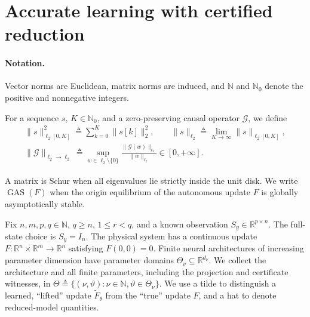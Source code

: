 \documentclass{l4dc2027}
\newcommand{\R}{\mathbb R}
\newcommand{\eqdef}{\triangleq}
\begin{document}
\section{Accurate learning with certified reduction}\label{sec:problem}
\paragraph{Notation.}
Vector norms are Euclidean, matrix norms are induced, and \mbox{$\mathbb N$} and \mbox{$\mathbb N_0$} denote the positive and nonnegative integers.


For a sequence \mbox{$s$}, \mbox{$K\in\mathbb N_0$}, and a zero-preserving causal operator \mbox{$\mathcal G$}, we define
\[
 \begin{gathered}
 \|s\|_{\ell_2[0,K]}^2
 \eqdef\sum_{k=0}^K\|s[k]\|_2^2,
 \qquad
 \|s\|_{\ell_2}
 \eqdef\lim_{K\to\infty}\|s\|_{\ell_2[0,K]},\\
 \|\mathcal G\|_{\ell_2\to\ell_2}
 \eqdef\sup_{w\in\ell_2\setminus\{0\}}
 \frac{\|\mathcal G(w)\|_{\ell_2}}{\|w\|_{\ell_2}}
 \in[0,+\infty].
 \end{gathered}
\]

A matrix is Schur when all eigenvalues lie strictly inside the unit disk.
We write \mbox{$\operatorname{GAS}(F)$} when the origin equilibrium of the autonomous update \mbox{$F$} is globally asymptotically stable.

Fix \mbox{$n,m,p,q\in\mathbb N$}, \mbox{$q\ge n$}, \mbox{$1\le r<q$}, and a known observation \mbox{$S_y\in\R^{p\times n}$}.
The full-state choice is \mbox{$S_y=I_n$}.
The physical system has a continuous update \mbox{$F:\R^n\times\R^m\to\R^n$} satisfying \mbox{$F(0,0)=0$}.
Finite neural architectures of increasing parameter dimension have parameter domains \mbox{$\Theta_\nu\subseteq\R^{d_\nu}$}.
We collect the architecture and all finite parameters, including the projection and certificate witnesses, in \mbox{$\Theta\eqdef\{(\nu,\vartheta):\nu\in\mathbb N,\vartheta\in\Theta_\nu\}$}.
We use a tilde to distinguish a learned, ``lifted'' update \mbox{$\widetilde F_\theta$} from the ``true'' update \mbox{$F$}, and a hat to denote reduced-model quantities.
\end{document}
